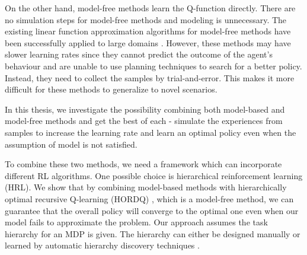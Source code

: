 On the other hand, model-free methods learn the Q-function directly. 
There are no simulation steps for model-free methods and modeling is unnecessary. 
The existing linear function approximation algorithms for model-free methods have been successfully 
applied to large domains \cite{LSTD99, KeepAway}. 
However, these methods may have slower learning rates since they cannot predict
the outcome of the agent's behaviour and are unable to use planning techniques to 
search for a better policy. Instead, they need to collect the samples by trial-and-error.
This makes it more difficult for these methods to generalize to novel scenarios.



In this thesis, we investigate the possibility combining both model-based and model-free methods 
and get the best of each - simulate the experiences from samples to increase the learning rate
and learn an optimal policy even when the assumption of model is not satisfied. 


To combine these two methods, we need a framework which can incorporate different RL algorithms.
One possible choice is hierarchical reinforcement learning (HRL). 
We show that by combining model-based methods with 
hierarchically optimal recursive Q-learning (HORDQ) \cite{HORDQ}, which is a model-free method, we can 
guarantee that the overall policy will converge to the optimal one even when our model
fails to approximate the problem. 
Our approach assumes the task hierarchy for an MDP is given. The hierarchy can either be 
designed manually or learned by automatic hierarchy discovery techniques \cite{HexQ}.


